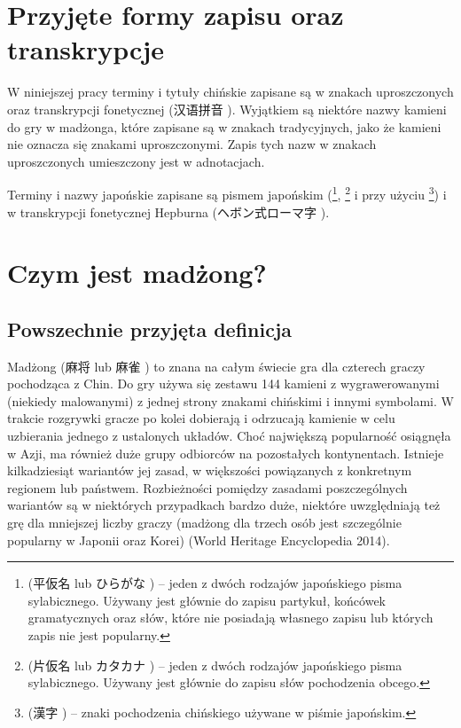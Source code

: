 \introduction
\section{Przyjęte formy zapisu oraz transkrypcje}
W niniejszej pracy terminy i tytuły chińskie zapisane są w znakach uproszczonych
oraz transkrypcji fonetycznej  (汉语拼音 ).
Wyjątkiem są niektóre nazwy kamieni do gry w madżonga, które zapisane są w
znakach tradycyjnych, jako że kamieni nie oznacza się znakami uproszczonymi.
Zapis tych nazw w znakach uproszczonych umieszczony jest w adnotacjach. 

Terminy i nazwy japońskie zapisane są pismem japońskim
(\footnote{ (平仮名 lub ひらがな )
-- jeden z dwóch rodzajów japońskiego pisma sylabicznego. Używany jest głównie do
zapisu partykuł, końcówek gramatycznych oraz słów, które nie posiadają
własnego zapisu  lub których zapis  nie jest
popularny.}, \footnote{ (片仮名 lub カタカナ
) -- jeden z dwóch rodzajów japońskiego pisma sylabicznego.
Używany jest głównie do zapisu słów pochodzenia obcego.} i przy użyciu
\footnote{ (漢字 ) -- znaki pochodzenia
chińskiego używane w piśmie japońskim.})  i w
transkrypcji fonetycznej Hepburna (ヘボン式ローマ字 ).
\section{Czym jest madżong?}
\subsection{Powszechnie przyjęta definicja}
Madżong (麻将  lub 麻雀 ) to znana na całym świecie
gra dla czterech graczy pochodząca z Chin. Do gry używa się zestawu 144 kamieni
z wygrawerowanymi (niekiedy malowanymi) z jednej strony znakami chińskimi i
innymi symbolami. W trakcie rozgrywki gracze po kolei dobierają i odrzucają
kamienie w celu uzbierania jednego z ustalonych układów. Choć największą
popularność osiągnęła w Azji, ma również duże grupy odbiorców na pozostałych
kontynentach.
Istnieje kilkadziesiąt wariantów jej zasad, w większości powiązanych z
konkretnym regionem lub państwem. Rozbieżności pomiędzy zasadami poszczególnych
wariantów są w niektórych przypadkach bardzo duże, niektóre uwzględniają też grę
dla mniejszej liczby graczy (madżong dla trzech osób jest szczególnie popularny
w Japonii oraz Korei) (World Heritage Encyclopedia 2014).
